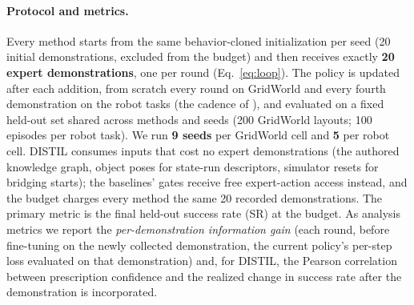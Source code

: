\documentclass[letterpaper]{article} %
\begin{document}
\paragraph{Protocol and metrics.}
Every method starts from the same behavior-cloned initialization per seed
(20 initial demonstrations, excluded from the budget) and then receives
exactly \textbf{20 expert demonstrations}, one per round
(Eq.~\ref{eq:loop}). The policy is updated after each addition, from
scratch every round on GridWorld and every fourth demonstration on the
robot tasks (the cadence of \citealp{lee2025diffdagger}), and evaluated on
a fixed held-out set shared across methods and seeds (200 GridWorld
layouts; 100 episodes per robot task). We run \textbf{9 seeds} per
GridWorld cell and \textbf{5} per robot cell. DISTIL consumes inputs that
cost no expert demonstrations (the authored knowledge graph, object poses
for state-run descriptors, simulator resets for bridging starts); the
baselines' gates receive free expert-action access instead, and the budget
charges every method the same 20 recorded demonstrations.
The primary metric is the final held-out success
rate (SR) at the budget. As analysis metrics we report the
\emph{per-demonstration information gain} (each round, before fine-tuning on
the newly collected demonstration, the current policy's per-step loss
evaluated on that demonstration) and, for DISTIL, the Pearson correlation
between prescription confidence and the realized change in success rate
after the demonstration is incorporated.
\end{document}

